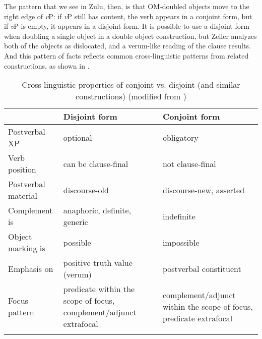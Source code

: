 \documentclass[output=paper]{langscibook}
\begin{document}

The pattern that we see in Zulu, then, is that OM-doubled objects move to the right edge of \textit{v}P: if \textit{v}P still has content, the verb appears in a conjoint form, but if \textit{v}P is empty, it appears in a disjoint form. It is possible to use a disjoint form when doubling a single object in a double object construction, but Zeller analyzes both of the objects as dislocated, and a verum-like reading of the clause results. And this pattern of facts reflects common cross-linguistic patterns from related constructions, as shown in .


\begin{table}
\caption{Cross-linguistic properties of conjoint vs. disjoint (and similar constructions)  (modified from \citealt[328]{Guldemann:2003:ProgressiveFocusBantu})}
\label{CjDjTable}
\begin{tabularx}{\textwidth}{lQQ}
\lsptoprule
 & Disjoint form & Conjoint form \\
\midrule 
Postverbal XP  &  optional  &  obligatory  \\ 
Verb position  & can be clause-final  & not clause-final   \\ 
Postverbal material  & discourse-old  & discourse-new, asserted  \\
Complement is  & anaphoric, definite, generic  & indefinite  \\
Object marking is  & possible  & impossible  \\
Emphasis on  & positive truth value (verum)  & postverbal constituent  \\
Focus pattern  &  predicate within the scope of focus, complement/adjunct extrafocal & complement/adjunct within the scope of focus, predicate extrafocal \\
\lspbottomrule
\end{tabularx}
\end{table} 
\end{document}
